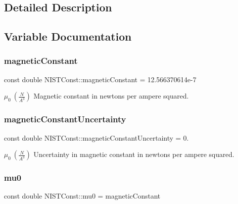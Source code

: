 \subsection{Detailed Description}


\subsection{Variable Documentation}
\mbox{\label{group___magnetic_constant_ga511860d1f2830ae6a85e1b1df8522071}} 
\subsubsection{\texorpdfstring{magnetic\+Constant}{magneticConstant}}
{\footnotesize\ttfamily const double N\+I\+S\+T\+Const\+::magnetic\+Constant = 12.\+566370614e-\/7}

$\mu_0 \ (\frac{N}{A^3})$ Magnetic constant in newtons per ampere squared. \mbox{\label{group___magnetic_constant_ga17f91f2aa414afe44a0bc84825034a4e}} 
\subsubsection{\texorpdfstring{magnetic\+Constant\+Uncertainty}{magneticConstantUncertainty}}
{\footnotesize\ttfamily const double N\+I\+S\+T\+Const\+::magnetic\+Constant\+Uncertainty = 0.}

$\mu_0 \ (\frac{N}{A^3})$ Uncertainty in magnetic constant in newtons per ampere squared. \mbox{\label{group___magnetic_constant_gaee4806f14e9b0f48347b2d29ddcd2668}} 
\subsubsection{\texorpdfstring{mu0}{mu0}}
{\footnotesize\ttfamily const double N\+I\+S\+T\+Const\+::mu0 = magnetic\+Constant}

